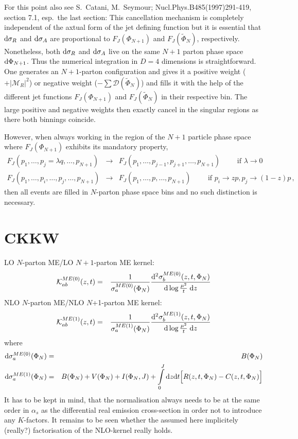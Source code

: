 \documentclass[a4paper,10pt]{scrartcl}
\newcommand{\done}{{\rm d}}
\newcommand{\nnb}{\nonumber}
\begin{document}
For this point also see S.~Catani, M.~Seymour; Nucl.Phys.B485(1997)291-419,
section 7.1, esp.~the last section: This cancellation mechanism is completely
independent of the axtual form of the jet defining function but it is essential
that $\done\sigma_R$ and $\done\sigma_A$ are proportional to $F_J(\Phi_{N+1})$
and $F_J(\tilde\Phi_N)$, respectively. Nonetheless, both $\done\sigma_R$ and
$\done\sigma_A$ live on the same $N+1$ parton phase space $\done\Phi_{N+1}$.
Thus the numerical integration in $D=4$ dimensions is straightforward. One
generates an $N+1$-parton configuration and gives it a positive weight
($+|\mathcal{M}_R|^2$) or negative weight ($-\sum\mathcal{D}(\tilde\Phi_N)$)
and fills it with the help of the different jet functions $F_J(\Phi_{N+1})$ and
$F_J(\tilde\Phi_N)$ in their respective bin. The large positive and negative
weights then exactly cancel in the singular regions as there both binnings
coincide.

However, when always working in the region of the $N+1$ particle phase space
where $F_J(\Phi_{N+1})$ exhibits its mandatory property,
\begin{eqnarray}
 F_J(p_1,\ldots,p_j=\lambda q,\ldots,p_{N+1})
&\to& F_J(p_1,\ldots,p_{j-1},p_{j+1},\ldots,p_{N+1})\qquad\mbox{ if }\lambda\to 0 \\
 F_J(p_1,\ldots,p_i,\ldots,p_j,\ldots,p_{N+1})
&\to& F_J(p_1,\ldots,p,\ldots,p_{N+1})\qquad\mbox{ if }p_i\to zp,p_j\to(1-z)p \nnb\,,
\end{eqnarray}
then all events are filled in $N$-parton phase space bins and no such distinction
is necessary.



\newpage
\section{CKKW}

LO $N$-parton ME/LO $N+1$-parton ME kernel:
\begin{eqnarray}
 \mathcal{K}_{ab}^{ME(0)}(z,t)
& = & \frac{1}{\sigma_a^{ME(0)}(\Phi_N)}
	\frac{\done^2\sigma_b^{ME(0)}(z,t,\Phi_N)}{\done\log\frac{\mu^2}{t}\;\done z}
\end{eqnarray}
NLO $N$-parton ME/NLO $N$+1-parton ME kernel:
\begin{eqnarray}
 \mathcal{K}_{ab}^{ME(1)}(z,t)
& = & \frac{1}{\sigma_a^{ME(1)}(\Phi_N)}
	\frac{\done^2\sigma_b^{ME(1)}(z,t,\Phi_N)}{\done\log\frac{\mu^2}{t}\;\done z}
\end{eqnarray}
where
\begin{eqnarray}
 \done\sigma_a^{ME(0)}(\Phi_N)
& = & B(\Phi_N) \\
 \done\sigma_a^{ME(1)}(\Phi_N)
& = & B(\Phi_N) + V(\Phi_N) + I(\Phi_N,J)
	+ \int\limits_0^J \done z\done t \Big[R(z,t,\Phi_N)-C(z,t,\Phi_N)\Big]
\end{eqnarray}
It has to be kept in mind, that the normalisation always needs to be at the
same order in $\alpha_s$ as the differential real emission cross-section in
order not to introduce any $K$-factors. It remains to be seen whether the
assumed here implicitely (really?) factorisation of the NLO-kernel really holds.
\end{document}
